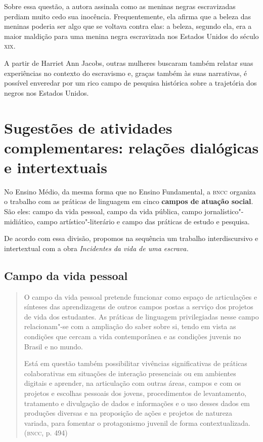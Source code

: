 \documentclass[12pt]{extarticle}
\begin{document}
Sobre essa questão, a autora assinala como as meninas negras
escravizadas perdiam muito cedo sua inocência. Frequentemente, ela
afirma que a beleza das meninas poderia ser algo que se voltava contra
elas: a beleza, segundo ela, era a maior maldição para uma menina negra
escravizada nos Estados Unidos do século \textsc{xix}.

A partir de Harriet Ann Jacobs, outras mulheres buscaram também relatar
suas experiências no contexto do escravismo e, graças também às suas
narrativas, é possível enveredar por um rico campo de pesquisa histórica
sobre a trajetória dos negros nos Estados Unidos.

\section{Sugestões de atividades complementares: relações dialógicas e
intertextuais}


No Ensino Médio, da mesma forma que no Ensino Fundamental, a \textsc{bncc}
organiza o trabalho com as práticas de linguagem em cinco \textbf{campos
de atuação social}. São eles: campo da vida pessoal, campo da vida
pública, campo jornalístico"-midiático, campo artístico"-literário e campo
das práticas de estudo e pesquisa.

De acordo com essa divisão, propomos na sequência um trabalho
interdiscursivo e intertextual com a obra \emph{Incidentes da vida de uma escrava.}

\subsection{Campo da vida pessoal}

\begin{quote}
O campo da vida pessoal pretende funcionar como espaço de articulações
e sínteses das aprendizagens de outros campos postas a serviço dos
projetos de vida dos estudantes. As práticas de linguagem privilegiadas
nesse campo relacionam"-se com a ampliação do saber sobre si, tendo em
vista as condições que cercam a vida contemporânea e as condições
juvenis no Brasil e no mundo.

Está em questão também possibilitar vivências significativas de práticas
colaborativas em situações de interação presenciais ou em ambientes
digitais e aprender, na articulação com outras áreas, campos e com os
projetos e escolhas pessoais dos jovens, procedimentos de levantamento,
tratamento e divulgação de dados e informações e o uso desses dados em
produções diversas e na proposição de ações e projetos de natureza
variada, para fomentar o protagonismo juvenil de forma
contextualizada. (\textsc{bncc}, p. 494)
\end{quote}
\end{document}
